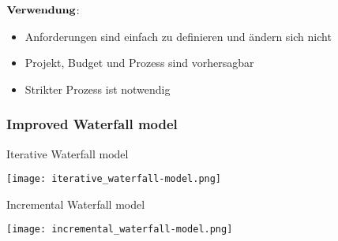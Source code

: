 $\bold{Verwendung}$: \newline
\begin{itemize}
	\item Anforderungen sind einfach zu definieren und ändern sich nicht
	\item Projekt, Budget und Prozess sind vorhersagbar
	\item Strikter Prozess ist notwendig
\end{itemize}
\subsubsection{Improved Waterfall model}
\begin{table}[H]
\caption{Iterative Waterfall model}
\texttt{[image: iterative\_waterfall-model.png]}
\end{table}
\begin{table}[H]
\caption{Incremental Waterfall model}
\texttt{[image: incremental\_waterfall-model.png]}
\end{table}
